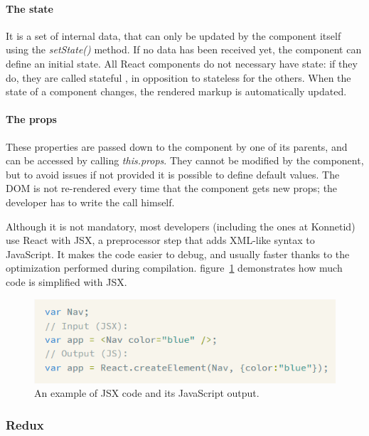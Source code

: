 \paragraph{The state} It is a set of internal data, that can only be updated by the component itself using the \textit{setState()}  method.
If no data has been received yet, the component can define an initial state. All React components do not necessary have state: if they do,
they are called \guillemotleft{} stateful \guillemotright{}, in opposition to \guillemotleft{} stateless \guillemotright{} for the others.
When the state of a component changes, the rendered markup is automatically updated.

\paragraph{The props} These properties are passed down to the component by one of its parents, and can be accessed by calling \textit{this.props}.
They cannot be modified by the component, but to avoid issues if not provided it is possible to define default values.
The DOM is not re-rendered every time that the component gets new props; the developer has to write the call himself.

Although it is not mandatory, most developers (including the ones at Konnetid) use React with JSX, a preprocessor step that adds XML-like syntax to JavaScript.
It makes the code easier to debug, and usually faster thanks to the optimization performed during compilation. {\sc figure}~\ref{fig:jsx} demonstrates how
much code is simplified with JSX.

\begin{figure}[H]
    \centering
    \includegraphics[scale=0.9]{figure/jsx.png}
    \caption{An example of JSX code and its JavaScript output.}
    \label{fig:jsx}
\end{figure}

\subsubsection{Redux}
\label{sssec:redux}

